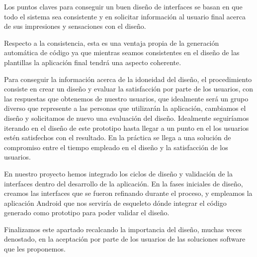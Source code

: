 Los puntos claves para conseguir un buen diseño de interfaces se basan en que todo el sistema sea consistente y en solicitar información al usuario final acerca de sus impresiones y sensaciones con el diseño.\par 
Respecto a la consistencia, esta es una ventaja propia de la generación automática de código ya que mientras seamos consistentes en el diseño de las plantillas la aplicación final tendrá una aspecto coherente.\par
Para conseguir la información acerca de la idoneidad del diseño, el procedimiento consiste en crear un diseño y evaluar la satisfacción por parte de los usuarios, con las respuestas que obtenemos de nuestro usuarios, que idealmente será un grupo diverso que represente a las personas que utilizarán la aplicación, cambiamos el diseño y solicitamos de nuevo una evaluación del diseño. Idealmente seguiríamos iterando en el diseño de este prototipo hasta llegar a un punto en el los usuarios estén satisfechos con el resultado. En la práctica se llega a una solución de compromiso entre el tiempo empleado en el diseño y la satisfacción de los usuarios.\par
En nuestro proyecto hemos integrado los ciclos de diseño y validación de la interfaces dentro del desarrollo de la aplicación. En la fases iniciales de diseño, creamos las interfaces que se fueron refinando durante el proceso, y empleamos la aplicación Android que nos serviría de esqueleto dónde integrar el código generado como prototipo para poder validar el diseño.\medskip \par
Finalizamos este apartado recalcando la importancia del diseño, muchas veces denostado, en la aceptación por parte de los usuarios de las soluciones software que les proponemos. 

